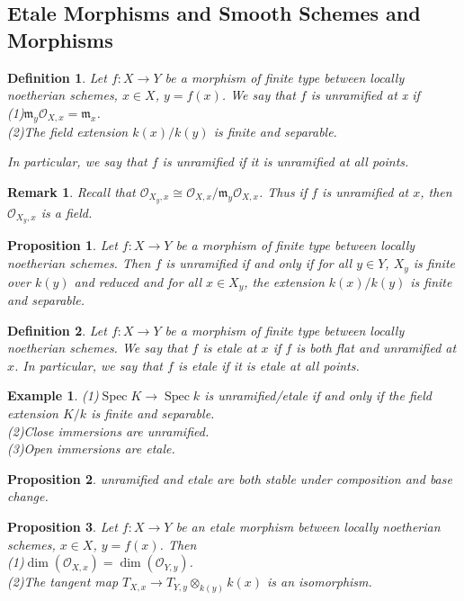 \documentclass{ctexart}
\newtheorem{definition}{Definition}[section]
\newtheorem{remark}{Remark}[section]
\newtheorem{proposition}{Proposition}[section]
\newtheorem{example}{Example}[section]
\newcommand{\spec}{\operatorname{Spec}}
\begin{document}
\subsection{Etale Morphisms and Smooth Schemes and Morphisms}
\begin{definition}
    Let $f: X \longrightarrow Y$ be a morphism of finite type between locally noetherian schemes, $x\in X$, $y = f(x)$.
    We say that $f$ is unramified at x if \\
    (1)$\mathfrak{m}_{y}\mathcal{O}_{X, x} = \mathfrak{m}_{x}$. \\
    (2)The field extension $k(x)/k(y)$ is finite and separable.
    \par
    In particular, we say that $f$ is unramified if it is unramified at all points.
\end{definition}
\begin{remark}
    Recall that $\mathcal{O}_{X_{y}, x} \cong \mathcal{O}_{X, x}/\mathfrak{m}_{y}\mathcal{O}_{X, x}$.
    Thus if $f$ is unramified at $x$, then $\mathcal{O}_{X_{y}, x}$ is a field.
\end{remark}
\begin{proposition}
    Let $f: X \longrightarrow Y$ be a morphism of finite type between locally noetherian schemes.
    Then $f$ is unramified if and only if for all $y\in Y$, $X_{y}$ is finite over $k(y)$ and reduced and for all $x\in X_{y}$, the extension $k(x)/k(y)$ is finite and separable.
    \label{Proposition 5.6}
\end{proposition}
\begin{definition}
    Let $f: X \longrightarrow Y$ be a morphism of finite type between locally noetherian schemes.
    We say that $f$ is etale at $x$ if $f$ is both flat and unramified at $x$.
    In particular, we say that $f$ is etale if it is etale at all points.
\end{definition}
\begin{example}
    (1)$\spec K \longrightarrow \spec k$ is unramified/etale if and only if the field extension $K/k$ is finite and separable. \\
    (2)Close immersions are unramified. \\
    (3)Open immersions are etale.
\end{example}
\begin{proposition}
    unramified and etale are both stable under composition and base change.
    \label{Proposition 5.7}
\end{proposition}
\begin{proposition}
    Let $f: X \longrightarrow Y$ be an etale morphism between locally noetherian schemes, $x\in X$, $y = f(x)$.
    Then \\
    (1)$\dim(\mathcal{O}_{X, x}) = \dim(\mathcal{O}_{Y, y})$. \\
    (2)The tangent map $T_{X, x} \longrightarrow T_{Y, y} \otimes_{k(y)} k(x)$ is an isomorphism.
    \label{Proposition 5.8}
\end{proposition}
\end{document}
